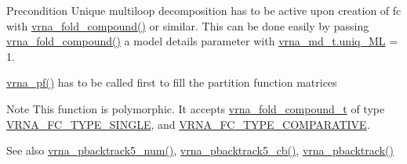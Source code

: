 \begin{DoxyPrecond}{Precondition}
Unique multiloop decomposition has to be active upon creation of {\ttfamily fc} with \mbox{\hyperlink{group__fold__compound_ga6601d994ba32b11511b36f68b08403be}{vrna\+\_\+fold\+\_\+compound()}} or similar. This can be done easily by passing \mbox{\hyperlink{group__fold__compound_ga6601d994ba32b11511b36f68b08403be}{vrna\+\_\+fold\+\_\+compound()}} a model details parameter with \mbox{\hyperlink{group__model__details_ade065b814a4e2e72ead93ab502613ed2}{vrna\+\_\+md\+\_\+t.\+uniq\+\_\+\+ML}} = 1. 

\mbox{\hyperlink{group__part__func__global_ga29e256d688ad221b78d37f427e0e99bc}{vrna\+\_\+pf()}} has to be called first to fill the partition function matrices
\end{DoxyPrecond}
\begin{DoxyNote}{Note}
This function is polymorphic. It accepts \mbox{\hyperlink{group__fold__compound_ga1b0cef17fd40466cef5968eaeeff6166}{vrna\+\_\+fold\+\_\+compound\+\_\+t}} of type \mbox{\hyperlink{group__fold__compound_gga01a4ff86fa71deaaa5d1abbd95a1447da7e264dd3cf2dc9b6448caabcb7763cd6}{V\+R\+N\+A\+\_\+\+F\+C\+\_\+\+T\+Y\+P\+E\+\_\+\+S\+I\+N\+G\+LE}}, and \mbox{\hyperlink{group__fold__compound_gga01a4ff86fa71deaaa5d1abbd95a1447dab821ce46ea3cf665be97df22a76f5023}{V\+R\+N\+A\+\_\+\+F\+C\+\_\+\+T\+Y\+P\+E\+\_\+\+C\+O\+M\+P\+A\+R\+A\+T\+I\+VE}}.
\end{DoxyNote}
\begin{DoxySeeAlso}{See also}
\mbox{\hyperlink{group__subopt__stochbt_ga30c3ddff868c44eecfdb07d99a2422ba}{vrna\+\_\+pbacktrack5\+\_\+num()}}, \mbox{\hyperlink{group__subopt__stochbt_ga626beb5b5b962d7e7c8433cd2cfd4e93}{vrna\+\_\+pbacktrack5\+\_\+cb()}}, \mbox{\hyperlink{group__subopt__stochbt_ga594844ac73c4e66e00d6791b31540634}{vrna\+\_\+pbacktrack()}}
\end{DoxySeeAlso}

